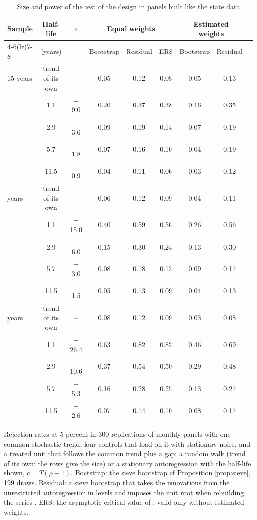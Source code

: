 \begin{table}[htbp]
\centering
\caption{Size and power of the test of the design in panels built like the state data\label{tab:screen-power}}
\footnotesize
\setlength{\tabcolsep}{4pt}
\begin{tabular}{lcccccccc}
\toprule
Sample & Half-life & $c$ & \multicolumn{3}{c}{Equal weights} & \multicolumn{2}{c}{Estimated weights} \\
\cmidrule(lr){4-6}\cmidrule(lr){7-8}
 & (years) & & Bootstrap & Residual & ERS & Bootstrap & Residual \\
\midrule
15 years & trend of its own & -- & 0.05 & 0.12 & 0.08 & 0.05 & 0.13 \\
 & 1.1 & $-$9.0 & 0.20 & 0.37 & 0.38 & 0.16 & 0.35 \\
 & 2.9 & $-$3.6 & 0.09 & 0.19 & 0.14 & 0.07 & 0.19 \\
 & 5.7 & $-$1.8 & 0.07 & 0.16 & 0.10 & 0.04 & 0.19 \\
 & 11.5 & $-$0.9 & 0.04 & 0.11 & 0.06 & 0.03 & 0.12 \\
\addlinespace
25 years & trend of its own & -- & 0.06 & 0.12 & 0.09 & 0.04 & 0.11 \\
 & 1.1 & $-$15.0 & 0.40 & 0.59 & 0.56 & 0.26 & 0.56 \\
 & 2.9 & $-$6.0 & 0.15 & 0.30 & 0.24 & 0.13 & 0.30 \\
 & 5.7 & $-$3.0 & 0.08 & 0.18 & 0.13 & 0.09 & 0.17 \\
 & 11.5 & $-$1.5 & 0.05 & 0.13 & 0.09 & 0.04 & 0.13 \\
\addlinespace
44 years & trend of its own & -- & 0.08 & 0.12 & 0.09 & 0.03 & 0.08 \\
 & 1.1 & $-$26.4 & 0.63 & 0.82 & 0.82 & 0.46 & 0.69 \\
 & 2.9 & $-$10.6 & 0.37 & 0.54 & 0.50 & 0.29 & 0.48 \\
 & 5.7 & $-$5.3 & 0.16 & 0.28 & 0.25 & 0.13 & 0.27 \\
 & 11.5 & $-$2.6 & 0.07 & 0.14 & 0.10 & 0.08 & 0.17 \\
\bottomrule
\end{tabular}
\par\smallskip\parbox{0.95\textwidth}{\footnotesize Rejection rates at 5 percent in 300 replications of monthly panels with one common stochastic trend, four controls that load on it with stationary noise, and a treated unit that follows the common trend plus a gap: a random walk (trend of its own: the rows give the size) or a stationary autoregression with the half-life shown, $c=T(\rho-1)$. Bootstrap: the sieve bootstrap of Proposition \ref{prop:sieve}, 199 draws. Residual: a sieve bootstrap that takes the innovations from the unrestricted autoregression in levels and imposes the unit root when rebuilding the series \citep{PaparoditisPolitis2003,PalmSmeekesUrbain2008}. ERS: the asymptotic critical value of \citet{ERS1996}, valid only without estimated weights.}
\end{table}

